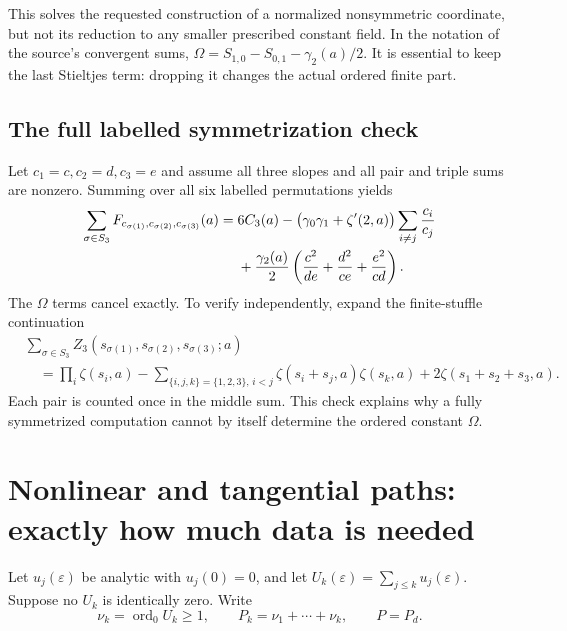 \documentclass[11pt,a4paper]{article}
\numberwithin{equation}{section}
\theoremstyle{definition}\newtheorem{definition}[theorem]{Definition}
\theoremstyle{remark}\newtheorem{remark}[theorem]{Remark}
\DeclareMathOperator{\ord}{ord}
\newcommand{\eps}{\varepsilon}
\begin{document}
This solves the requested construction of a normalized nonsymmetric
coordinate, but not its reduction to any smaller prescribed constant
field. In the notation of the source's convergent sums,
$\Omega=S_{1,0}-S_{0,1}-\gamma_2(a)/2$. It is essential to keep the
last Stieltjes term: dropping it changes the actual ordered finite part.

\subsection{The full labelled symmetrization check}
Let $c_1=c,c_2=d,c_3=e$ and assume all three slopes and all pair and triple
sums are nonzero. Summing over all six labelled permutations yields
\begin{align}\label{eq:symcheck}
 \sum_{\sigma\in S_3}F_{c_{\sigma(1)},c_{\sigma(2)},c_{\sigma(3)}}(a)
 ={}&6C_3(a)
 -\bigl(\gamma_0\gamma_1+\zeta'(2,a)\bigr)
          \sum_{i\ne j}\frac{c_i}{c_j}\notag\\
 &+\frac{\gamma_2(a)}2
       \left(\frac{c^2}{de}+\frac{d^2}{ce}+\frac{e^2}{cd}\right).
\end{align}
The $\Omega$ terms cancel exactly. To verify independently, expand the
finite-stuffle continuation
\begin{align*}
 &\sum_{\sigma\in S_3}Z_3(s_{\sigma(1)},s_{\sigma(2)},s_{\sigma(3)};a)\\
 &\quad=\prod_i\zeta(s_i,a)
 -\sum_{\{i,j,k\}=\{1,2,3\}\!,\,i<j}\zeta(s_i+s_j,a)\zeta(s_k,a)
 +2\zeta(s_1+s_2+s_3,a).
\end{align*}
Each pair is counted once in the middle sum. This check explains why a
fully symmetrized computation cannot by itself determine the ordered
constant $\Omega$.

\section{Nonlinear and tangential paths: exactly how much data is needed}
\label{sec:curves}

Let $u_j(\eps)$ be analytic with $u_j(0)=0$, and let
$U_k(\eps)=\sum_{j\le k}u_j(\eps)$. Suppose no $U_k$ is identically
zero. Write
\begin{equation}\label{eq:valuations}
 \nu_k=\ord_0U_k\ge1,\qquad
 P_k=\nu_1+\cdots+\nu_k,\qquad P=P_d.
\end{equation}
\end{document}
